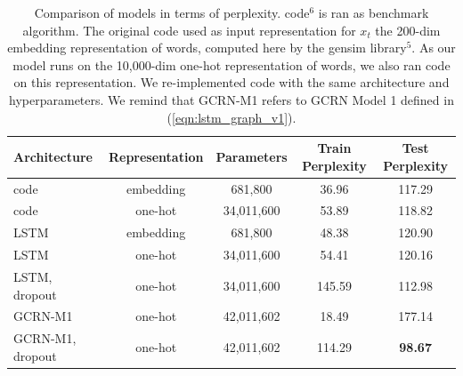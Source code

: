 \documentclass{article}
\newcommand{\eqnref}[1]{(\ref{eqn:#1})}
\begin{document}
\begin{table}[t]
	\centering
	{\small
		\begin{tabular}{lcccc}
			\toprule
			Architecture & Representation & Parameters & Train Perplexity & Test Perplexity  \\
			\midrule
			\citet{zaremba2014recurrent} code\footnotemark[6] & embedding & 681,800 & 36.96 & 117.29 \\
			\citet{zaremba2014recurrent} code\footnotemark[6] & one-hot & 34,011,600 & 53.89 & 118.82 \\
			LSTM & embedding & 681,800 & 48.38 & 120.90 \\
			LSTM & one-hot & 34,011,600 & 54.41 & 120.16 \\
			LSTM, dropout & one-hot & 34,011,600 & 145.59 & 112.98 \\
			GCRN-M1 & one-hot & 42,011,602 & 18.49 & 177.14 \\
			GCRN-M1, dropout & one-hot & 42,011,602 & 114.29 & {\bf 98.67} \\
			\bottomrule
		\end{tabular}
	}
	\caption{Comparison of models in terms of perplexity. \cite{zaremba2014recurrent} code$^6$ is ran as benchmark algorithm. The original \cite{zaremba2014recurrent} code used as input representation for $x_t$ the 200-dim embedding representation of words, computed here by the gensim library$^5$. As our model runs on the 10,000-dim one-hot representation of words, we also ran \cite{zaremba2014recurrent} code on this representation. We re-implemented \cite{zaremba2014recurrent} code with the same architecture and hyperparameters. We remind that GCRN-M1 refers to GCRN Model 1 defined in \eqnref{lstm_graph_v1}.} 
	\label{tab1}
\end{table}
\end{document}
